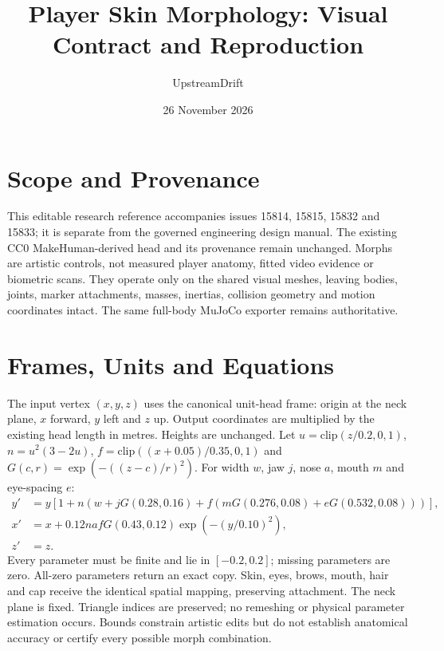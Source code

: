 \documentclass{article}
\title{Player Skin Morphology: Visual Contract and Reproduction}
\author{UpstreamDrift}
\date{26 November 2026}
\begin{document}
\maketitle
\section{Scope and Provenance}
This editable research reference accompanies issues 15814, 15815, 15832 and
15833; it is
separate from the governed engineering design manual. The existing CC0
MakeHuman-derived head and its provenance remain unchanged. Morphs are artistic
controls, not measured player anatomy, fitted video evidence or biometric scans.
They operate only on the shared visual meshes, leaving bodies, joints, marker
attachments, masses, inertias, collision geometry and motion coordinates intact.
The same full-body MuJoCo exporter remains authoritative.
\section{Frames, Units and Equations}
The input vertex $(x,y,z)$ uses the canonical unit-head frame: origin at the
neck plane, $x$ forward, $y$ left and $z$ up. Output coordinates are multiplied
by the existing head length in metres. Heights are unchanged.
Let $u=\mathrm{clip}(z/0.2,0,1)$, $n=u^2(3-2u)$,
$f=\mathrm{clip}((x+0.05)/0.35,0,1)$ and
$G(c,r)=\exp(-((z-c)/r)^2)$. For width $w$, jaw $j$, nose $a$,
mouth $m$ and eye-spacing $e$:
\begin{align*}
y' &= y[1+n(w+jG(0.28,0.16)
       +f(mG(0.276,0.08)+eG(0.532,0.08)))],\\
x' &= x+0.12nafG(0.43,0.12)\exp(-(y/0.10)^2),\\
z' &= z.
\end{align*}
Every parameter must be finite and lie in $[-0.2,0.2]$; missing parameters
are zero. All-zero parameters return an exact copy. Skin, eyes, brows, mouth,
hair and cap receive the identical spatial mapping, preserving attachment.
The neck plane is fixed. Triangle indices are preserved; no remeshing or
physical parameter estimation occurs. Bounds constrain artistic edits but do
not establish anatomical accuracy or certify every possible morph combination.
\end{document}
